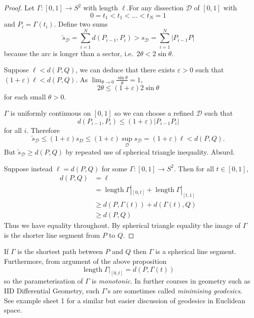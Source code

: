 \documentclass[a4paper]{article}
\theoremstyle{definition}
\begin{document}
\begin{proof}
  Let \(\Gamma: [0, 1] \to S^2\) with length \(\ell\).For any dissection \(\mathcal D\) of \([0, 1]\) with
  \[
    0 = t_1 < t_1 < \dots < t_N = 1
  \]
  and \(P_i = \Gamma(t_i)\). Define two sums
  \[
    \tilde s_{\mathcal D} = \sum_{i = 1}^N d(P_{i -1}, P_i) > s_{\mathcal D} = \sum_{i = 1}^N |P_{i - 1}P|
  \]
  because the arc is longer than a sector, i.e.\ \(2\theta < 2 \sin \theta\).

  Suppose \(\ell < d(P, Q)\), we can deduce that there exists \(\varepsilon > 0\) such that \((1 + \varepsilon)\ell < d(P, Q)\). As \(\lim_{\theta \to 0} \frac{\sin \theta}{\theta} = 1\),
  \[
    2\theta \leq (1 + \varepsilon) 2\sin \theta
  \]
  for each small \(\theta > 0\).

  \(\Gamma\) is uniformly continuous on \([0, 1]\) so we can choose a refined \(\mathcal D\) such that
  \[
    d(P_{i - 1}, P_i) \leq (1 + \varepsilon)|P_{i - 1}P_i|
  \]
  for all \(i\). Therefore
  \[
    \tilde s_{\mathcal D} \leq (1 + \varepsilon)s_D \leq (1 + \varepsilon)\sup_{\mathcal D} s_{\mathcal D} = (1 + \varepsilon) \ell < d(P, Q).
  \]
  But \(\tilde s_{\mathcal D} \geq d(P, Q)\) by repeated use of spherical triangle inequality. Absurd.

  Suppose instead \(\ell = d(P, Q)\) for some \(\Gamma: [0, 1] \to S^2\). Then for all \(t \in [0, 1]\),
  \begin{align*}
    d(P, Q) &= \ell \\
            &= \operatorname{length} \Gamma|_{[0, t]} + \operatorname{length} \Gamma|_{[t, 1]} \\
            &\geq d(P, \Gamma(t)) + d(\Gamma(t), Q) \\
            &\geq d(P, Q) 
  \end{align*}
  Thus we have equality throughout. By spherical triangle equality the image of \(\Gamma\) is the shorter line segment from \(P\) to \(Q\).
\end{proof}

\begin{remark}
  If \(\Gamma\) is the shortest path between \(P\) and \(Q\) then \(\Gamma\) is a spherical line segment. Furthermore, from argument of the above proposition
  \[
    \operatorname{length} \Gamma|_{[0, t]} = d(P, \Gamma(t))
  \]
  so the parameterisation of \(\Gamma\) is \emph{monotonic}. In further courses in geometry such as IID Differential Geometry, such \(\Gamma\)'s are sometimes called \emph{minimising geodesics}. See example sheet 1 for a similar but easier discussion of geodesics in Euclidean space.
\end{remark}
\end{document}
